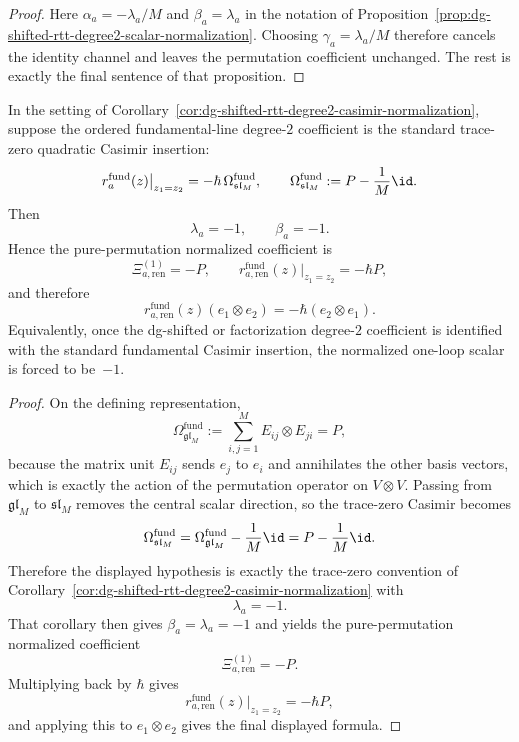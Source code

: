 \begin{proof}
Here $\alpha_a=-\lambda_a/M$ and $\beta_a=\lambda_a$ in the notation of
Proposition~\ref{prop:dg-shifted-rtt-degree2-scalar-normalization}.
Choosing $\gamma_a=\lambda_a/M$ therefore cancels the identity channel
and leaves the permutation coefficient unchanged.  The rest is exactly
the final sentence of that proposition.
\end{proof}

\begin{proposition}
\label{prop:dg-shifted-rtt-degree2-fundamental-casimir}
In the setting of
Corollary~\ref{cor:dg-shifted-rtt-degree2-casimir-normalization},
suppose the ordered fundamental-line degree-$2$ coefficient is the
standard trace-zero quadratic Casimir insertion:
\[
r_a^{\mathrm{fund}}(z)\big|_{z_1=z_2}
=
-\hbar\,\Omega_{\mathfrak{sl}_M}^{\mathrm{fund}},
\qquad
\Omega_{\mathfrak{sl}_M}^{\mathrm{fund}}
:=
P-\frac{1}{M}\id.
\]
Then
\[
\lambda_a=-1,
\qquad
\beta_a=-1.
\]
Hence the pure-permutation normalized coefficient is
\[
\Xi_{a,\mathrm{ren}}^{(1)}=-P,
\qquad
r_{a,\mathrm{ren}}^{\mathrm{fund}}(z)\big|_{z_1=z_2}
=
-\hbar P,
\]
and therefore
\[
r_{a,\mathrm{ren}}^{\mathrm{fund}}(z)(e_1\otimes e_2)
=
-\hbar(e_2\otimes e_1).
\]
Equivalently, once the dg-shifted or factorization degree-$2$
coefficient is identified with the standard fundamental Casimir
insertion, the normalized one-loop scalar is forced to be~$-1$.
\end{proposition}

\begin{proof}
On the defining representation,
\[
\Omega_{\mathfrak{gl}_M}^{\mathrm{fund}}
:=
\sum_{i,j=1}^M E_{ij}\otimes E_{ji}
=
P,
\]
because the matrix unit $E_{ij}$ sends $e_j$ to $e_i$ and annihilates
the other basis vectors, which is exactly the action of the permutation
operator on $V\otimes V$.  Passing from $\mathfrak{gl}_M$ to
$\mathfrak{sl}_M$ removes the central scalar direction, so the
trace-zero Casimir becomes
\[
\Omega_{\mathfrak{sl}_M}^{\mathrm{fund}}
=
\Omega_{\mathfrak{gl}_M}^{\mathrm{fund}}
-\frac{1}{M}\id
=
P-\frac{1}{M}\id.
\]
Therefore the displayed hypothesis is exactly the trace-zero
convention of
Corollary~\ref{cor:dg-shifted-rtt-degree2-casimir-normalization} with
\[
\lambda_a=-1.
\]
That corollary then gives $\beta_a=\lambda_a=-1$ and yields the
pure-permutation normalized coefficient
\[
\Xi_{a,\mathrm{ren}}^{(1)}=-P.
\]
Multiplying back by $\hbar$ gives
\[
r_{a,\mathrm{ren}}^{\mathrm{fund}}(z)\big|_{z_1=z_2}
=
-\hbar P,
\]
and applying this to $e_1\otimes e_2$ gives the final displayed
formula.
\end{proof}

